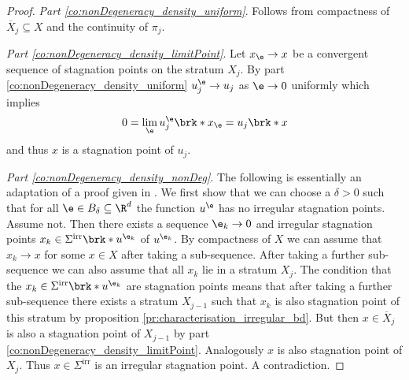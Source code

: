 \begin{proof}
  \emph{Part \ref{co:nonDegeneracy_density_uniform}}. Follows from compactness of $\overline{X}_j\subseteq X$ and the continuity of $\pi_j$.

  \emph{Part \ref{co:nonDegeneracy_density_limitPoint}}. Let $x_\e\to x$ be a convergent sequence of stagnation points on the stratum $X_j$.
  By part \ref{co:nonDegeneracy_density_uniform} $u_j^\e\to u_j$ as $\e\to0$ uniformly which implies
  \begin{align}
    0=\lim_\e u_j^\e\brk*{x_\e}
    =u_j\brk*{x}
  \end{align}
  and thus $x$ is a stagnation point of $u_j$.

  \emph{Part \ref{co:nonDegeneracy_density_nonDeg}}. 
  The following is essentially an adaptation of a proof given in \cite[§2]{Morse1970}.
  We first show that we can choose a $\delta>0$ such that for all $\e\in B_\delta\subseteq\R^d$ the function $u^\e$ has
  no irregular stagnation points.
  Assume not. Then there exists a sequence $\e_k\to0$ and irregular stagnation points $x_k\in\Sigma^\text{irr}\brk*{u^{\e_k}} $ of $u^{\e_k}$.
  By compactness of $X$ we can assume that $x_k\to x$ for some $x\in X$ after taking a sub-sequence.
  After taking a further sub-sequence we can also assume that all $x_k$ lie in a stratum $X_j$.
  The condition that the $x_k\in\Sigma^\text{irr}\brk*{u^{\e_k}}$ are stagnation points
  means that after taking a further sub-sequence there exists a stratum $X_{j-1}$ such that $x_k$ is also stagnation point of this stratum
  by proposition \ref{pr:characterisation_irregular_bd}.
  But then $x\in\overline{X}_j$ is also a stagnation point of $X_{j-1}$ by part \ref{co:nonDegeneracy_density_limitPoint}.
  Analogously $x$ is also stagnation point of $X_j$.
  Thus $x\in\Sigma^\text{irr}$
  is an irregular stagnation point. A contradiction.


\end{proof}
